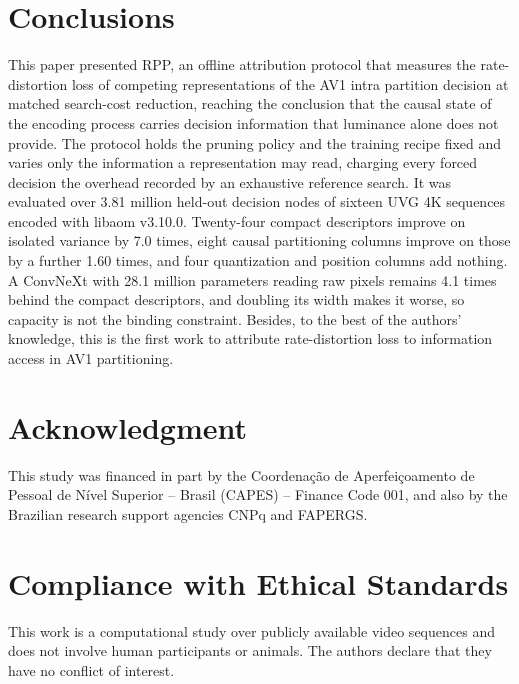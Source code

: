 \documentclass[conference]{IEEEtran}
\begin{document}
\section{Conclusions}

This paper presented RPP, an offline attribution protocol that measures the
rate-distortion loss of competing representations of the AV1 intra partition
decision at matched search-cost reduction, reaching the conclusion that the causal
state of the encoding process carries decision information that luminance alone
does not provide. The protocol holds the pruning policy and the training recipe
fixed and varies only the information a representation may read, charging every
forced decision the overhead recorded by an exhaustive reference search. It was
evaluated over 3.81 million held-out decision nodes of sixteen UVG 4K sequences
encoded with libaom v3.10.0. Twenty-four compact descriptors
improve on isolated variance by 7.0 times, eight causal partitioning columns
improve on those by a further 1.60 times, and four quantization and position
columns add nothing. A ConvNeXt with 28.1 million parameters reading raw pixels
remains 4.1 times behind the compact descriptors, and doubling its width makes it
worse, so capacity is not the binding constraint. Besides, to the best of the
authors' knowledge, this is the first work to attribute rate-distortion loss to
information access in AV1 partitioning.

\section*{Acknowledgment}

This study was financed in part by the Coordena\c{c}\~ao de Aperfei\c{c}oamento de
Pessoal de N\'ivel Superior -- Brasil (CAPES) -- Finance Code 001, and also by the
Brazilian research support agencies CNPq and FAPERGS.

\section*{Compliance with Ethical Standards}

This work is a computational study over publicly available video sequences and
does not involve human participants or animals. The authors declare that they have
no conflict of interest.
\end{document}
